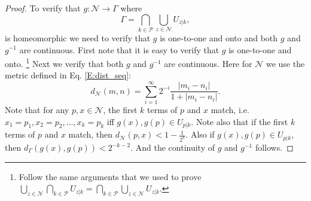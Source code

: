 \begin{proof}
To verify that $g:\mathcal{N}\to \Gamma$ where
\[
	\Gamma=\bigcap_{k\in\mathcal{P}} \bigcup_{z\in\mathcal{N}} U_{z|k},
\]
is homeomorphic we need to verify that $g$ is one-to-one and onto and
both $g$ and $g^{-1}$ are continuous. 
First note that it is easy to verify that $g$ is one-to-one and onto.
\footnote{Follow the same arguments that we used to prove
$\bigcup_{z\in\mathcal{N}} \bigcap_{k\in\mathcal{P}} U_{z|k}
		=\bigcap_{k\in\mathcal{P}} \bigcup_{z\in\mathcal{N}} U_{z|k}$.}
Next we verify that both $g$ and $g^{-1}$ are continuous.
Here for $\mathcal{N}$ we use the metric defined in Eq. \ref{E:dist_seq}:
\[
	d_{\mathcal{N}}(m,n) 
	  = \sum_{i=1}^{\infty} 2^{-i} \frac{|m_i-n_i|}{1+|m_i-n_i|}.
\]
Note that for any $p,x\in\mathcal{N}$, the first $k$ terms of $p$ and $x$ 
match, i.e. $x_1=p_1,x_2=p_2, \dots, x_k=p_k$
iff $g(x),g(p)\in U_{p|k}$. Note also that if the first $k$ terms of $p$ and $x$
match, then $d_{\mathcal{N}}(p,x) < 1-\frac{1}{2^k}$. Also if 
$g(x),g(p)\in U_{p|k}$, then $d_{\Gamma}(g(x),g(p)) < 2^{-k-2}$. And the
continuity of $g$ and $g^{-1}$ follows.


% 
% 

\end{proof}

